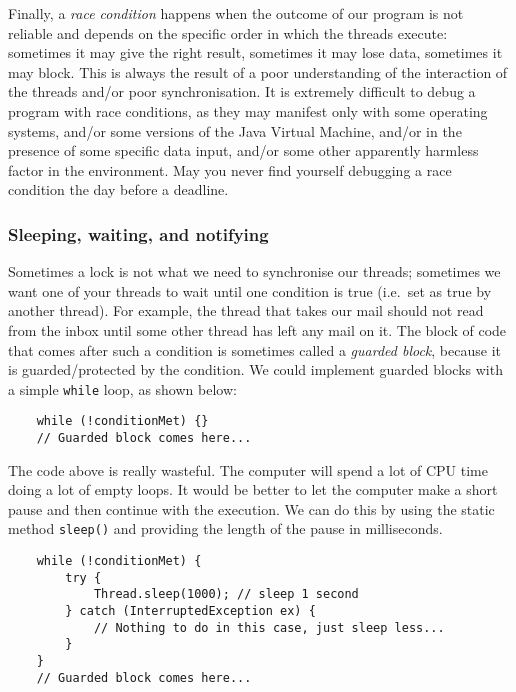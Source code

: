 Finally, a \emph{race condition} happens when the outcome of our
program is not reliable and depends on the specific order in which the
threads execute: sometimes it may give the right result, sometimes it
may lose data, sometimes it may block. This is always the result of a
poor understanding of the interaction of the threads and/or poor
synchronisation. It is extremely difficult to debug a program with
race conditions, as they may manifest only with some operating
systems, and/or some versions of the Java Virtual Machine, 
and/or in the presence of some specific data input, and/or
some other apparently harmless factor in the environment. May you
never find yourself debugging a race condition the day before a
deadline. 

\subsubsection{Sleeping, waiting, and notifying}
\label{sec:sleep-wait-notify}

Sometimes a lock is not what we need to synchronise our threads; 
sometimes we want one of your threads to wait until one condition is
true (i.e.~set as true by another thread). For example, the thread
that takes our mail should not read from the inbox until some other
thread has left any mail on it. The block of code that comes after
such a condition is sometimes called a \emph{guarded block}, because
it is guarded/protected by the condition. We could implement guarded
blocks with a simple \verb+while+ loop, as shown below:

\begin{verbatim}
    while (!conditionMet) {}
    // Guarded block comes here...
\end{verbatim}

The code above is really wasteful. The computer will spend a lot of
CPU time doing a lot of empty loops. It would be
better to let the computer make a short pause and then continue with
the execution. We can do this by using the static method
\verb+sleep()+ and providing the length of the pause in milliseconds. 

\begin{verbatim}
    while (!conditionMet) {
        try {
            Thread.sleep(1000); // sleep 1 second
        } catch (InterruptedException ex) {
            // Nothing to do in this case, just sleep less...
        }
    }  
    // Guarded block comes here...
\end{verbatim}

